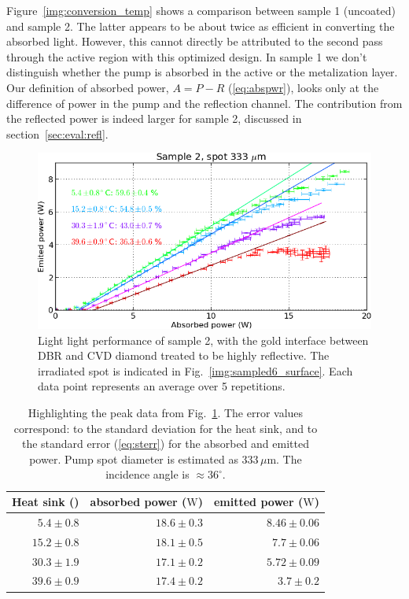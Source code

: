 Figure~\ref{img:conversion_temp}
shows a comparison between
sample 1 (uncoated)
and sample 2.
The latter appears to be
about twice as efficient
in converting the absorbed light.
However,
this cannot directly be attributed
to the second pass
through the active region
with this optimized design.
In sample 1
we don't distinguish
whether the pump is absorbed
in the active or the metalization layer.
Our definition of absorbed power,
$A=P-R$ (\ref{eq:abspwr}),
looks only at the difference
of power in the pump
and the reflection channel.
The contribution
from the reflected power
is indeed larger
for sample 2,
discussed in section~\ref{sec:eval:refl}.

\begin{figure}
\centering
\includegraphics[width=14.5cm]{img/LL_sampled6.png}
\caption{Light light performance
of sample 2,
with the gold interface
between DBR and CVD diamond
treated to be highly reflective.
The irradiated spot
is indicated
in Fig.~\ref{img:sampled6_surface}.
Each data point
represents an average
over 5 repetitions.}
\label{img:LL_sampled6}
\end{figure}

\begin{table}[h]
\centering
\caption{Highlighting the peak data from Fig.~\ref{img:LL_sampled6}.
The error values correspond:
to the standard deviation for the heat sink,
and to the standard error (\ref{eq:sterr})
for the absorbed and emitted power.
Pump spot diameter is estimated
as $333\,\mu\mathrm{m}$.
The incidence angle
is $\approx36^\circ$.}
\begin{tabular}{rrr}
\hline
Heat sink (\degr{}) &
absorbed power ($\mathrm{W}$) & emitted power ($\mathrm{W}$) \\
\hline
$5.4\pm0.8$ & $18.6\pm0.3$ & $8.46\pm0.06$ \\
$15.2\pm0.8$ & $18.1\pm0.5$ & $7.7\pm0.06$ \\
$30.3\pm1.9$ & $17.1\pm0.2$ & $5.72\pm0.09$ \\
$39.6\pm0.9$ & $17.4\pm0.2$ & $3.7\pm0.2$ \\
\hline
\end{tabular}
\label{tab:LL_sampled6}
\end{table}

